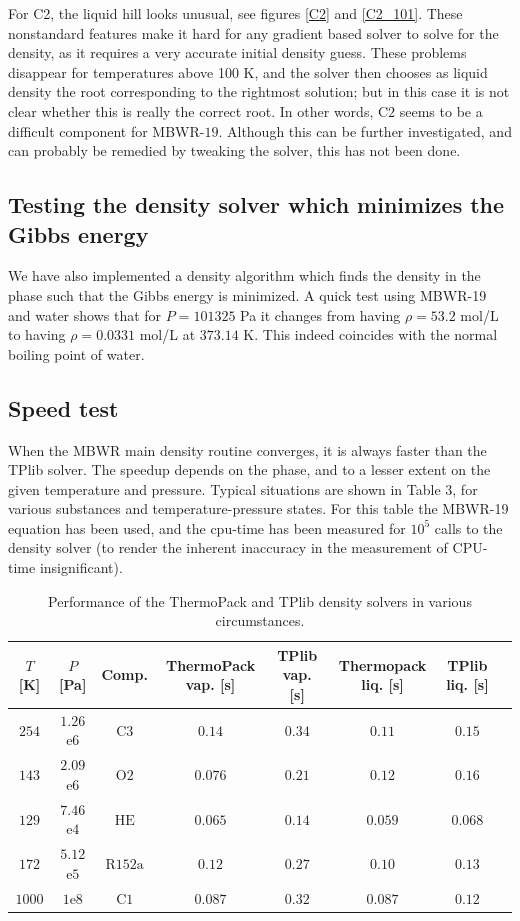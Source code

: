 \documentclass[english]{../thermomemo/thermomemo}
\numberwithin{equation}{section}
\begin{document}
For C2, the liquid hill looks unusual, see figures \ref{C2} and \ref{C2_101}. These
nonstandard features make it hard for any gradient based solver to
solve for the density, as it requires a very accurate initial density
guess. These problems disappear for temperatures above 100 K, and the
solver then chooses as liquid density the root corresponding to the rightmost
solution; but in this case it is not clear whether this is really the
correct root. In other words, C$2$ seems to be a difficult component
for MBWR-$19$. Although this can be further investigated, and can
probably be remedied by tweaking the solver, this has not been done.

\subsection{Testing the density solver which minimizes the Gibbs energy}
We have also implemented a density algorithm which finds the density
in the phase such that the Gibbs energy is minimized. A quick test using MBWR-19 and water
shows that for $P = 101325$ Pa it changes from having $\rho = 53.2$ mol/L to having $\rho = 0.0331$ mol/L at $373.14$ K. This indeed coincides with the normal boiling point of water.

\subsection{Speed test}
When the MBWR main density routine converges, it is always faster than
the TPlib solver. The speedup depends on the phase, and to a lesser extent on the given temperature and pressure. Typical situations
are shown in Table 3, for various substances and temperature-pressure states. For this table the MBWR-19 equation has been used, and the cpu-time has been measured for $10^5$ calls to the density solver (to render the inherent inaccuracy in the measurement of CPU-time insignificant).

\begin{table}
  \label{MBWR19times}
  \centering
  \begin{tabular}{c c c c c c c c }
    $T$ [K]		        & $P$ [Pa]		& Comp.     & ThermoPack vap. [s] & TPlib vap. [s] & Thermopack liq. [s]  & TPlib liq. [s]  \\
    \hline
    $254$	        & $1.26$e$6$    &$\mathrm C 3$		&$0.14$            & $0.34$	 & $0.11$        &$0.15$	    \\
    $143$               & $2.09$e$6$  	&$\mathrm O2$		&$0.076$           & $0.21$	 & $0.12$     	  &$0.16$		        \\
    $129$	        & $7.46$e$4$   	&$\mathrm{HE}$		&$0.065$           & $0.14$	 & $0.059$    	  &$0.068$		            \\
    $172$               & $5.12$e$5$   	&$\mathrm R152 \mathrm a$	&$0.12$    & $0.27$	 & $0.10$    	  &$0.13$	        \\
    $1000$	        & $1$e$8$      	&$\mathrm C1$ 		&$0.087$            & $0.32$	 & $0.087$    	  &$0.12$	      \\         
  \end{tabular}
  \caption{Performance of the ThermoPack and TPlib density solvers in various circumstances.}
\end{table}
\end{document}
